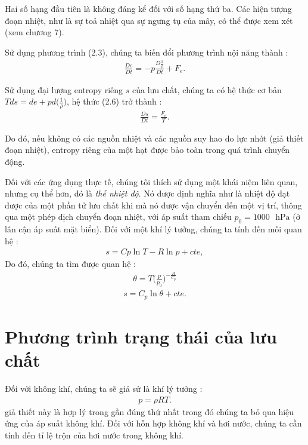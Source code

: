\documentclass[DONG_HOC_KHI_QUYEN.tex]{subfiles}
\begin{document}
Hai số hạng đầu tiên là không đáng kể đối với số hạng thứ ba. Các hiện tượng đoạn nhiệt, như là sự toả nhiệt qua sự ngưng tụ của mây, có thể được xem xét (xem chương 7).

Sử dụng phương trình (2.3), chúng ta biến đổi phương trình nội năng thành :
\begin{equation}
	\begin{aligned}
		\frac{De}{Dt} =  - p \frac{D\frac{1}{\rho}}{Dt}+F_e.
	\end{aligned}
\end{equation}

Sử dụng đại lượng entropy riêng $s$ của lưu chất, chúng ta có hệ thức cơ bản $Tds = de +pd\Big(  \frac{1}{\rho} \Big)$, hệ thức (2.6) trở thành :
\begin{equation}
	\begin{aligned}
		\frac{Ds}{Dt} =  \frac{F_e}{T}.
	\end{aligned}
\end{equation}

Do đó, nếu không có các nguồn nhiệt và các nguồn suy hao do lực nhớt (giả thiết đoạn nhiệt), entropy riêng của một hạt được bảo toàn trong quá trình chuyển động.

Đối với các ứng dụng thực tế, chúng tôi thích sử dụng một khái niệm liên quan, nhưng cụ thể hơn, đó là \textit{thế nhiệt độ}. Nó được định nghĩa như là nhiệt độ đạt được của một phần tử lưu chất khi mà nó được vận chuyển đến một vị trí, thông qua một phép dịch chuyển đoạn nhiệt, với áp suất tham chiếu $p_0 = 1000\text{ } \unit{\hecto\pascal}$ (ở lân cận áp suất mặt biển). Đối với một khí lý tưởng, chúng ta tính đến mối quan hệ :
\begin{equation}
	\begin{aligned}
		s = Cp\ln T - R\ln p + cte,
	\end{aligned}
\end{equation}
Do đó, chúng ta tìm được quan hệ :
\begin{equation}
	\begin{aligned}
		\theta = T \Big( \frac{p}{p_0} \Big)^{-\frac{R}{C_p}}
	\end{aligned}
\end{equation}
\begin{equation}
	\begin{aligned}
		s = C_p\ln\theta + cte.
	\end{aligned}
\end{equation}
\section{Phương trình trạng thái của lưu chất}
Đối với không khí, chúng ta sẽ giả sử là khí lý tưởng :
\begin{equation}
	\begin{aligned}
		p = \rho RT.
	\end{aligned}
\end{equation}
giả thiết này là hợp lý trong gần đúng thứ nhất trong đó chúng ta bỏ qua hiệu ứng của áp suất không khí. Đối với hỗn hợp không khí và hơi nước, chúng ta cần tính đến tỉ lệ trộn của hơi nước trong không khí.
\end{document}
